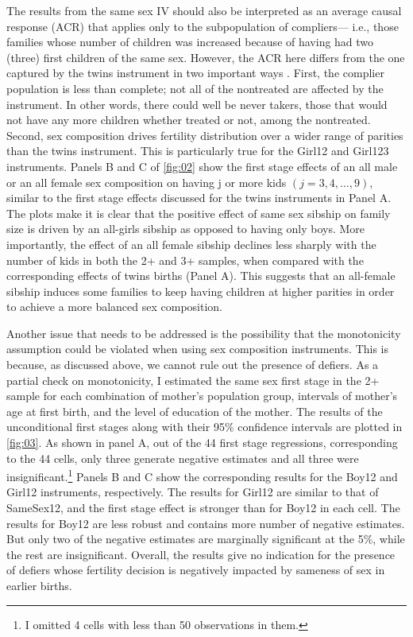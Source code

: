 The results from the same sex IV should also be interpreted as an average causal response (ACR) that applies only to the subpopulation of compliers--- i.e., those families whose number of children was increased because of having had two (three) first children of the same sex. However, the ACR here differs from the one captured by the twins instrument in two important ways \parencite{angrist_multiple_2010}. First, the complier population is less than complete; not all of the nontreated are affected by the instrument. In other words, there could well be never takers, those that would not have any more children whether treated or not, among the nontreated. Second, sex composition drives fertility distribution over a wider range of parities than the twins instrument. This is particularly true for the Girl12 and Girl123 instruments. Panels B and C of \autoref{fig:02} show the first stage effects of an all male or an all female sex composition on having j or more kids $ (j = 3, 4, \dots, 9) $, similar to the first stage effects discussed for the twins instruments in Panel A. The plots make it is clear that the positive effect of same sex sibship on family size is driven by an all-girls sibship as opposed to having only boys. More importantly, the effect of an all female sibship declines less sharply with the number of kids in both the 2+ and 3+ samples, when compared with the corresponding effects of twins births (Panel A). This suggests that an all-female sibship induces some families to keep having children at higher parities in order to achieve a more balanced sex composition. 

Another issue that needs to be addressed is the possibility that the monotonicity assumption could be violated when using sex composition instruments. This is because, as discussed above, we cannot rule out the presence of defiers. As a partial check on monotonicity, I estimated the same sex first stage in the 2+ sample for each combination of mother’s population group, intervals of mother’s age at first birth, and the level of education of the mother. The results of the unconditional first stages along with their 95\% confidence intervals are plotted in \autoref{fig:03}. As shown in panel A, out of the 44 first stage regressions, corresponding to the 44 cells, only three generate negative estimates and all three were insignificant.\footnote{ I omitted 4 cells with less than 50 observations in them. } Panels B and C show the corresponding results for the Boy12 and Girl12 instruments, respectively. The results for Girl12 are similar to that of SameSex12, and the first stage effect is stronger than for Boy12 in each cell. The results for Boy12 are less robust and contains more number of negative estimates. But only two of the negative estimates are marginally significant at the 5\%, while the rest are insignificant. Overall, the results give no indication for the presence of defiers whose fertility decision is negatively impacted by sameness of sex in earlier births.






